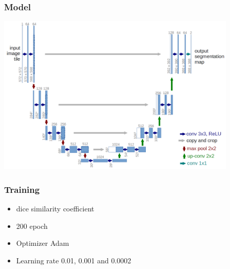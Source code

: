\documentclass[10pt,xcolor=pdflatex,hyperref={unicode}]{beamer}
\begin{document}
\begin{frame}\frametitle{Model}
    \includegraphics[width=\linewidth,height=3in]{img/u-net-architecture.png}\centering
\end{frame}

\begin{frame}\frametitle{Training}
    \begin{itemize}
        \item dice similarity coefficient
        \item 200 epoch
        \item Optimizer Adam
        \item Learning rate 0.01, 0.001 and 0.0002
    \end{itemize}
\end{frame}
\end{document}
